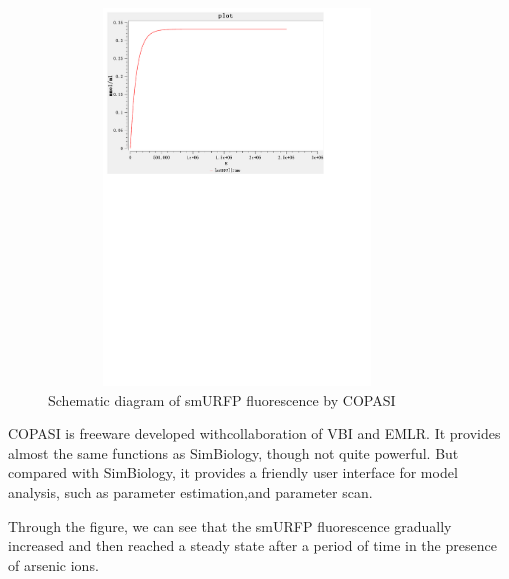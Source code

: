 \begin{figure}[h]
	\centering
	\includegraphics[width=10cm,height=10cm]{smuRFP}
	\caption{Schematic diagram of smURFP fluorescence by COPASI}
\end{figure}



COPASI is freeware developed withcollaboration of VBI and EMLR. It provides
almost the same functions as SimBiology, though not quite powerful. But compared with SimBiology, it provides a friendly user interface for model analysis, such as parameter estimation,and parameter scan.

Through the figure, we can see that the smURFP fluorescence gradually increased and then reached a steady state after a period of time  in the presence of arsenic ions.








